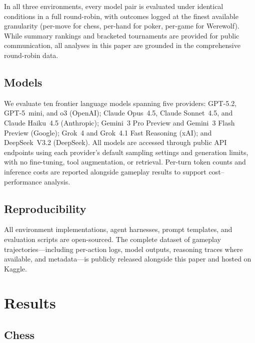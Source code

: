 \documentclass{article}
\begin{document}
In all three environments, every model pair is evaluated under identical conditions in a full round-robin, with outcomes logged at the finest available granularity (per-move for chess, per-hand for poker, per-game for Werewolf). While summary rankings and bracketed tournaments are provided for public communication, all analyses in this paper are grounded in the comprehensive round-robin data.


\subsection{Models}
\label{sec:models}

We evaluate ten frontier language models spanning five providers: GPT-5.2, GPT-5~mini, and o3 (OpenAI); Claude Opus~4.5, Claude Sonnet~4.5, and Claude Haiku~4.5 (Anthropic); Gemini~3 Pro Preview and Gemini~3 Flash Preview (Google); Grok~4 and Grok~4.1 Fast Reasoning (xAI); and DeepSeek~V3.2 (DeepSeek). All models are accessed through public API endpoints using each provider's default sampling settings and generation limits, with no fine-tuning, tool augmentation, or retrieval. Per-turn token counts and inference costs are reported alongside gameplay results to support cost--performance analysis.

\subsection{Reproducibility}
\label{sec:reproducibility}

All environment implementations, agent harnesses, prompt templates, and evaluation scripts are open-sourced. The complete dataset of gameplay trajectories---including per-action logs, model outputs, reasoning traces where available, and metadata---is publicly released alongside this paper and hosted on Kaggle. 


\section{Results}


\subsection{Chess}
\end{document}
